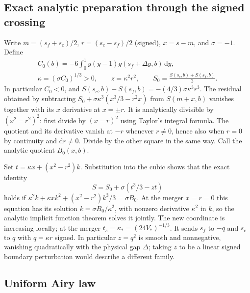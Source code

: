\documentclass[11pt]{article}
\newcommand{\dd}{\mathrm d}
\begin{document}
\subsection{Exact analytic preparation through the signed crossing}

Write \(m=(s_f+s_c)/2\), \(r=(s_c-s_f)/2\) (signed), \(x=s-m\), and \(\sigma=-1\). Define
\[
\begin{gathered}
 C_0(b)=-6\int_0^1 y(y-1)g(s_f+\Delta y,b)\,\dd y,\\
 \kappa=(\sigma C_0)^{1/3}>0,\qquad z=\kappa^2r^2,\qquad
 S_0=\frac{S(s_c,b)+S(s_f,b)}2 .
\end{gathered}
\]
In particular \(C_0<0\), and
\(S(s_c,b)-S(s_f,b)=-(4/3)\sigma\kappa^3 r^3\).
The residual obtained by subtracting \(S_0+\sigma\kappa^3(x^3/3-r^2x)\) from \(S(m+x,b)\) vanishes together with its \(x\) derivative at \(x=\pm r\). It is analytically divisible by \((x^2-r^2)^2\): first divide by \((x-r)^2\) using Taylor's integral formula. The quotient and its derivative vanish at \(-r\) whenever \(r\ne0\), hence also when \(r=0\) by continuity and \(\dd r\ne0\). Divide by the other square in the same way. Call the analytic quotient \(B_0(x,b)\).

Set \(t=\kappa x+(x^2-r^2)k\). Substitution into the cubic shows that the exact identity
\begin{equation}\label{eq:cubic}
 S=S_0+\sigma(t^3/3-zt)
\end{equation}
holds if
\(\kappa^2 k+\kappa x k^2+(x^2-r^2)k^3/3=\sigma B_0\).
At the merger \(x=r=0\) this equation has its solution \(k=\sigma B_0/\kappa^2\), with nonzero derivative \(\kappa^2\) in \(k\), so the analytic implicit function theorem solves it jointly. The new coordinate is increasing locally; at the merger \(t_s=\kappa_*=(24V_*)^{-1/3}\). It sends \(s_f\) to \(-q\) and \(s_c\) to \(q\) with \(q=\kappa r\) signed. In particular \(z=q^2\) is smooth and nonnegative, vanishing quadratically with the physical gap \(\Delta\); taking \(z\) to be a linear signed boundary perturbation would describe a different family.

\subsection{Uniform Airy law}
\end{document}
